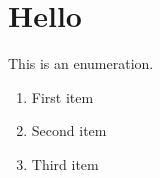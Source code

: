 \documentclass{article}
\begin{document}
\section{Hello}

This is an enumeration.

\begin{enumerate}
\item First item
\item Second item \makeatletter\show\reserved@d \show\reserved@a \show\reserved@b \show\@let@token \show\reserved@c \show\if@noitemarg \makeatother
\item Third item
\end{enumerate}
\end{document}

